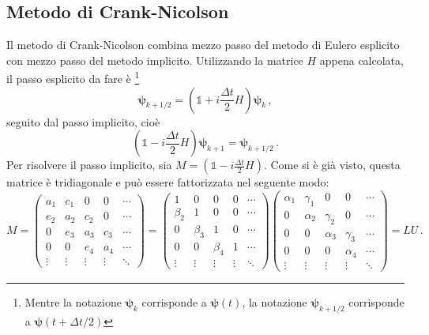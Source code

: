 \documentclass[a4paper, titlepage]{article}
\begin{document}
\subsection{Metodo di Crank-Nicolson}
Il metodo di Crank-Nicolson combina mezzo passo del metodo di Eulero esplicito con mezzo passo del metodo implicito. Utilizzando la matrice $H$ appena calcolata, il passo esplicito da fare è \footnote{Mentre la notazione $\bm{\psi}_k$ corrisponde a $\bm{\psi}(t)$, la notazione $\bm{\psi}_{k+1/2}$ corrisponde a $\bm{\psi}(t+\Delta t/2)$}
\begin{equation*}
    \bm{\psi}_{k+1/2} = \left(\mathbb{1} + i\frac{\Delta t}{2} H\right)\bm{\psi}_k\, ,
\end{equation*}
seguito dal passo implicito, cioè
\begin{equation*}
    \left(\mathbb{1} - i\frac{\Delta t}{2} H\right)\bm{\psi}_{k+1} = \bm{\psi}_{k+1/2}\, .
\end{equation*}
Per risolvere il passo implicito, sia $M = \left(\mathbb{1} - i\frac{\Delta t}{2} H\right)$. Come si è già visto, questa matrice è tridiagonale e può essere fattorizzata nel seguente modo:
\begin{equation*} 
    M = 
    \begin{pmatrix}
        a_1 & c_1 & 0 & 0 & \cdots \\
        e_2 & a_2 & c_2 & 0 & \cdots \\
        0 & e_3 & a_3 & c_3 & \cdots \\
        0 & 0 & e_4 & a_4 & \cdots \\
        \vdots & \vdots & \vdots & \vdots & \ddots 
    \end{pmatrix} = 
    \begin{pmatrix}
        1 & 0 & 0 & 0 & \cdots \\
        \beta_2 & 1 & 0 & 0 & \cdots \\
        0 & \beta_3 & 1 & 0 & \cdots \\
        0 & 0 & \beta_4 & 1 & \cdots \\
        \vdots & \vdots & \vdots & \vdots & \ddots 
    \end{pmatrix}
    \begin{pmatrix}
        \alpha_1 & \gamma_1 & 0 & 0 & \cdots \\
        0 & \alpha_2 & \gamma_2 & 0 & \cdots \\
        0 & 0 & \alpha_3 & \gamma_3 & \cdots \\
        0 & 0 & 0 & \alpha_4 & \cdots \\
        \vdots & \vdots & \vdots & \vdots & \ddots 
    \end{pmatrix}
    = LU\, .
\end{equation*}
\end{document}
